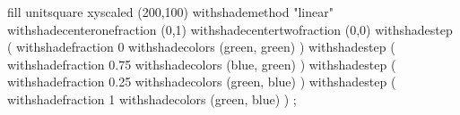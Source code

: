 
\startMPpage
   fill unitsquare xyscaled (200,100)
       withshademethod "linear"
       withshadecenteronefraction (0,1)
       withshadecentertwofraction (0,0)
       withshadestep (
           withshadefraction 0
           withshadecolors (green, green)
       )
       withshadestep (
           withshadefraction 0.75
           withshadecolors (blue, green)
       )
       withshadestep (
           withshadefraction 0.25
           withshadecolors (green, blue)
       )
       withshadestep (
           withshadefraction 1
           withshadecolors (green, blue)
       )
    ;
\stopMPpage

